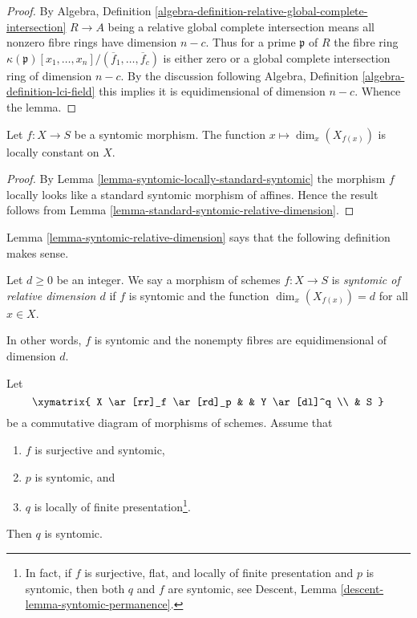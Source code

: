 \begin{proof}
By Algebra,
Definition \ref{algebra-definition-relative-global-complete-intersection}
$R \to A$ being a relative global complete intersection means
all nonzero fibre rings have dimension $n - c$.
Thus for a prime $\mathfrak p$ of $R$ the fibre ring
$\kappa(\mathfrak p)[x_1, \ldots, x_n]/(\overline{f}_1, \ldots, \overline{f}_c)$
is either zero or a global complete intersection ring of dimension $n - c$.
By the discussion following
Algebra, Definition \ref{algebra-definition-lci-field}
this implies it is equidimensional of dimension $n - c$.
Whence the lemma.
\end{proof}

\begin{lemma}
\label{lemma-syntomic-relative-dimension}
Let $f : X \to S$ be a syntomic morphism. The function
$x \mapsto \dim_x(X_{f(x)})$ is locally constant on $X$.
\end{lemma}

\begin{proof}
By Lemma \ref{lemma-syntomic-locally-standard-syntomic}
the morphism $f$ locally looks like a standard
syntomic morphism of affines. Hence the result follows
from Lemma \ref{lemma-standard-syntomic-relative-dimension}.
\end{proof}

\noindent
Lemma \ref{lemma-syntomic-relative-dimension}
says that the following definition makes sense.

\begin{definition}
\label{definition-syntomic-relative-dimension}
Let $d \geq 0$ be an integer. We say a morphism of schemes $f : X \to S$
is {\it syntomic of relative dimension $d$} if $f$ is syntomic and
the function $\dim_x(X_{f(x)}) = d$ for all $x \in X$.
\end{definition}

\noindent
In other words, $f$ is syntomic and the nonempty fibres are equidimensional
of dimension $d$.

\begin{lemma}
\label{lemma-syntomic-permanence}
Let
$$
\xymatrix{
X \ar[rr]_f \ar[rd]_p & &
Y \ar[dl]^q \\
& S
}
$$
be a commutative diagram of morphisms of schemes. Assume that
\begin{enumerate}
\item $f$ is surjective and syntomic,
\item $p$ is syntomic, and
\item $q$ is locally of finite presentation\footnote{In fact, if $f$ is
surjective, flat, and locally of finite presentation and $p$ is syntomic,
then both $q$ and $f$ are syntomic, see
Descent, Lemma \ref{descent-lemma-syntomic-permanence}.}.
\end{enumerate}
Then $q$ is syntomic.
\end{lemma}

